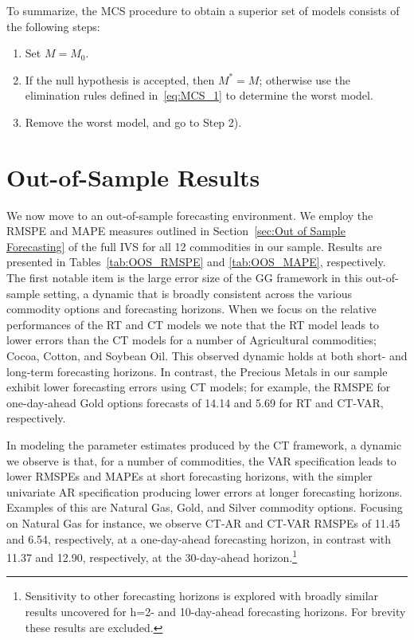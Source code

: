 \documentclass[12pt,a4paper]{article}
\begin{document}
To summarize, the MCS procedure to obtain a superior set of models consists of the following steps:
\begin{enumerate}
\item[1)] Set $M=M_0$.
\item[2)] If the null hypothesis is accepted, then $M^* = M$; otherwise use the elimination rules defined in~\eqref{eq:MCS_1} to determine the worst model.
\item[3)] Remove the worst model, and go to Step 2).
\end{enumerate}

\section{Out-of-Sample Results}\label{sec:Empirical Findings}
We now move to an out-of-sample forecasting environment. We employ the RMSPE and MAPE measures outlined in Section~\ref{sec:Out of Sample Forecasting} of the full IVS for all 12 commodities in our sample. Results are presented in Tables~\ref{tab:OOS_RMSPE} and \ref{tab:OOS_MAPE}, respectively. The first notable item is the large error size of the GG framework in this out-of-sample setting, a dynamic that is broadly consistent across the various commodity options and forecasting horizons. When we focus on the relative performances of the RT and CT models we note that the RT model leads to lower errors than the CT models for a number of Agricultural commodities; Cocoa, Cotton, and Soybean Oil. This observed dynamic holds at both short- and long-term forecasting horizons. In contrast, the Precious Metals in our sample exhibit lower forecasting errors using CT models; for example, the RMSPE for one-day-ahead Gold options forecasts of 14.14 and 5.69 for RT and CT-VAR, respectively.

In modeling the parameter estimates produced by the CT framework, a dynamic we observe is that, for a number of commodities, the VAR specification leads to lower RMSPEs and MAPEs at short forecasting horizons, with the simpler univariate AR specification producing lower errors at longer forecasting horizons. Examples of this are Natural Gas, Gold, and Silver commodity options. Focusing on Natural Gas for instance, we observe CT-AR and CT-VAR RMSPEs of 11.45 and 6.54, respectively, at a one-day-ahead forecasting horizon, in contrast with 11.37 and 12.90, respectively, at the 30-day-ahead horizon.\footnote{Sensitivity to other forecasting horizons is explored with broadly similar results uncovered for h=2- and 10-day-ahead forecasting horizons. For brevity these results are excluded.} 
\end{document}
